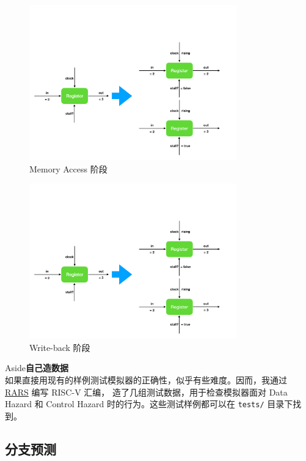 \documentclass[12pt]{article}
\newenvironment{aside}[1]
    { \begin{tcolorbox}[enlarge top by=0.5cm, enlarge bottom by=0.5cm] Aside\space\space\space\space \textbf{#1} \\
        } { \end{tcolorbox} }
\begin{document}
    \begin{figure}
        \centering
        \includegraphics[page=5,width=0.8\textwidth]{design.pdf}
        \caption{Memory Access 阶段}
        \label{fig:simulator-design-memory}
    \end{figure}
    \begin{figure}
        \centering
        \includegraphics[page=6,width=0.8\textwidth]{design.pdf}
        \caption{Write-back 阶段}
        \label{fig:simulator-design-writeback}
    \end{figure}

    \begin{aside}{自己造数据}
        如果直接用现有的样例测试模拟器的正确性，似乎有些难度。因而，我通过 
        \href{https://github.com/TheThirdOne/rars}{RARS} 编写 RISC-V 汇编，
        造了几组测试数据，用于检查模拟器面对 Data Hazard 和
        Control Hazard 时的行为。这些测试样例都可以在 \texttt{tests/} 目录下找到。
    \end{aside}
    
    \subsection{分支预测}
\end{document}
